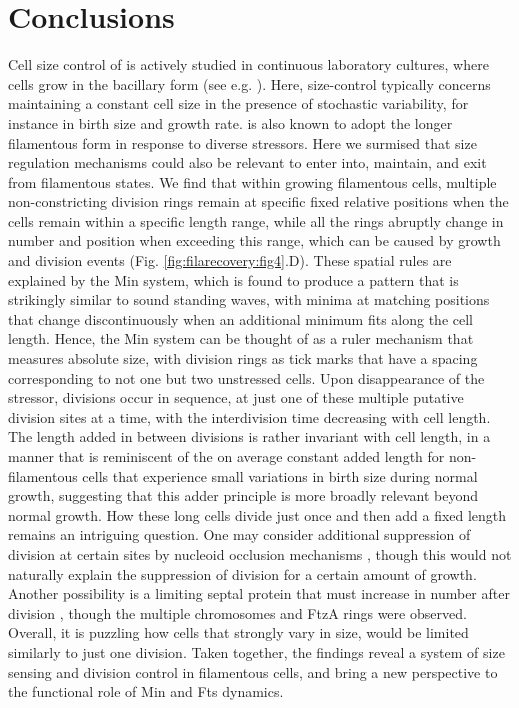 \section{Conclusions}
Cell size control of \ecoli is actively studied in continuous laboratory cultures, where cells grow in the bacillary form (see e.g. \cite{Marshall2012, Jorgensen2004, Robert2015, Chien2012, Turner2012, Wallden2016, Taheri-Araghi2014, Campos2014, Osella2014}). Here, size-control typically concerns maintaining a constant cell size in the presence of stochastic variability, for instance in birth size and growth rate. \ecoli is also known to adopt the longer filamentous form in response to diverse stressors. Here we surmised that size regulation mechanisms could also be relevant to enter into, maintain, and exit from filamentous states. We find that within growing filamentous cells, multiple non-constricting division rings remain at specific fixed relative positions when the cells remain within a specific length range, while all the rings abruptly change in number and position when exceeding this range, which can be caused by growth and division events (Fig. \ref{fig:filarecovery:fig4}.D). These spatial rules are explained by the Min system, which is found to produce a pattern that is strikingly similar to sound standing waves, with minima at matching positions that change discontinuously when an additional minimum fits along the cell length. Hence, the Min system can be thought of as a ruler mechanism that measures absolute size, with division rings as tick marks that have a spacing corresponding to not one but two unstressed cells. Upon disappearance of the stressor, divisions occur in sequence, at just one of these multiple putative division sites at a time, with the interdivision time decreasing with cell length. The length added in between divisions is rather invariant with cell length, in a manner that is reminiscent of the on average constant added length for non-filamentous cells that experience small variations in birth size during normal growth, suggesting that this adder principle is more broadly relevant beyond normal growth. How these long cells divide just once and then add a fixed length remains an intriguing question. One may consider additional suppression of division at certain sites by nucleoid occlusion mechanisms \cite{Wu2011, Mulder1989}, though this would not naturally explain the suppression of division for a certain amount of growth. Another possibility is a limiting septal protein that must increase in number after division \cite{Bi1990}, though the multiple chromosomes and FtzA rings were observed. Overall, it is puzzling how cells that strongly vary in size, would be limited similarly to just one division. Taken together, the findings reveal a system of size sensing and division control in filamentous \ecoli cells, and bring a new perspective to the functional role of Min and Fts dynamics.

